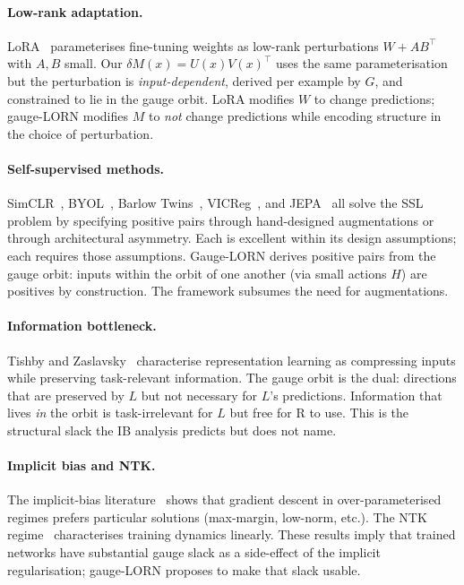 \documentclass[11pt, a4paper]{article}
\theoremstyle{plain}
\theoremstyle{definition}
\theoremstyle{remark}
\begin{document}
\paragraph{Low-rank adaptation.}
LoRA~\cite{hu2021lora} parameterises fine-tuning weights as low-rank perturbations $W + AB^{\!\top}$ with $A, B$ small.
Our $\delta M(x) = U(x) V(x)^{\!\top}$ uses the same parameterisation but the perturbation is \emph{input-dependent}, derived per example by $G$, and constrained to lie in the gauge orbit.
LoRA modifies $W$ to change predictions; gauge-LORN modifies $M$ to \emph{not} change predictions while encoding structure in the choice of perturbation.

\paragraph{Self-supervised methods.}
SimCLR~\cite{chen2020simclr}, BYOL~\cite{grill2020byol}, Barlow Twins~\cite{zbontar2021barlow}, VICReg~\cite{bardes2022vicreg}, and JEPA~\cite{assran2023ijepa} all solve the SSL problem by specifying positive pairs through hand-designed augmentations or through architectural asymmetry.
Each is excellent within its design assumptions; each requires those assumptions.
Gauge-LORN derives positive pairs from the gauge orbit: inputs within the orbit of one another (via small actions $H$) are positives by construction.
The framework subsumes the need for augmentations.

\paragraph{Information bottleneck.}
Tishby and Zaslavsky~\cite{tishby2015deep} characterise representation learning as compressing inputs while preserving task-relevant information.
The gauge orbit is the dual: directions that are preserved by $L$ but not necessary for $L$'s predictions.
Information that lives \emph{in} the orbit is task-irrelevant for $L$ but free for R to use.
This is the structural slack the IB analysis predicts but does not name.

\paragraph{Implicit bias and NTK.}
The implicit-bias literature~\cite{soudry2018implicit} shows that gradient descent in over-parameterised regimes prefers particular solutions (max-margin, low-norm, etc.).
The NTK regime~\cite{jacot2018ntk} characterises training dynamics linearly.
These results imply that trained networks have substantial gauge slack as a side-effect of the implicit regularisation; gauge-LORN proposes to make that slack usable.
\end{document}

